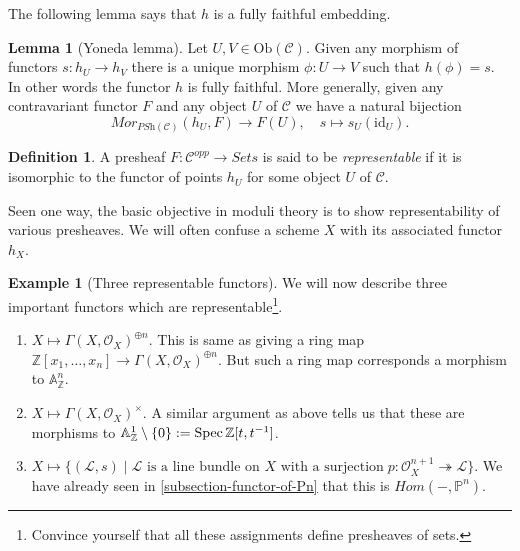 \documentclass[11pt]{amsart}
\newcommand{\Spec}{{\rm Spec \,}}
\newcommand{\sL}{{\mathcal L}}
\newcommand{\sO}{{\mathcal O}}
\newcommand{\A}{{\mathbb A}}
\renewcommand{\P}{{\mathbb P}}
\newcommand{\Z}{{\mathbb Z}}
\newcommand{\Ob}{\text{Ob}}
\theoremstyle{definition}
\newtheorem{lemma}[theorem]{Lemma}
\newtheorem{definition}[theorem]{Definition}
\newtheorem{example}[theorem]{Example}
\begin{document}
The following lemma says that $h$ is a fully faithful embedding.

\begin{lemma}[Yoneda lemma]
	\label{lemma-yoneda}
	Let $U, V \in \Ob(\mathcal{C})$.
	Given any morphism of functors $s : h_U \to h_V$
	there is a unique morphism $\phi : U \to V$
	such that $h(\phi) = s$. In other words the
	functor $h$ is fully faithful. More generally,
	given any contravariant functor $F$ and any object
	$U$ of $\mathcal{C}$ we have a natural bijection
	$$
	\mathit{Mor}_{\textit{PSh}(\mathcal{C})}(h_U, F) \longrightarrow F(U),
	\quad
	s \longmapsto s_U(\text{id}_U).
	$$
\end{lemma}

\begin{definition}
	\label{definition-representable-functor}
	A presheaf $F : \mathcal{C}^{opp}\to \textit{Sets}$ is said
	to be {\it representable} if it is isomorphic to the functor of
	points $h_U$ for some object $U$ of $\mathcal{C}$.
\end{definition}

Seen one way, the basic objective in moduli theory is to show representability of various presheaves. We will often confuse a scheme $X$ with its associated functor $h_X$.

\begin{example}[Three representable functors]\label{example-three-representable} 
	We will now describe three important functors which are representable\footnote{Convince yourself that all these assignments define presheaves of sets.}.
	\begin{enumerate}
		\item $X \mapsto \Gamma (X,\sO_X)^{\oplus n}$. This is same as giving a ring map $\Z[x_1,\ldots,x_n]\rightarrow \Gamma (X,\sO_X)^{\oplus n}$. But such a ring map corresponds a morphism to $\A_{\Z}^n$.
		\item $X \mapsto \Gamma (X,\sO_X)^{\times}$. A similar argument as above tells us that these are morphisms to $\A_{\Z}^1\setminus \{0\}:= \Spec \Z[t,t^{-1}]$.
		\item $X \mapsto \{ (\sL,s)\;|\; \text{$\sL$ is a line bundle on $X$ with a surjection}\; p:\sO_X^{n+1}\twoheadrightarrow \sL\}$. We have already seen in \ref{subsection-functor-of-Pn} that this is $\mathit{Hom}(-,\P^n)$.
	\end{enumerate}
\end{example}
\end{document}
